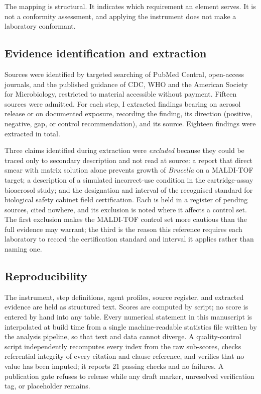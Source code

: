 The mapping is structural. It indicates which requirement an element serves. It is not a
conformity assessment, and applying the instrument does not make a laboratory conformant.

\subsection{Evidence identification and extraction}

Sources were identified by targeted searching of PubMed Central, open-access journals, and
the published guidance of CDC, WHO and the American Society for Microbiology, restricted
to material accessible without payment. Fifteen sources were admitted. For each step, I
extracted findings bearing on aerosol release or on documented exposure, recording the
finding, its direction (positive, negative, gap, or control recommendation), and its
source. Eighteen findings were extracted in total.

Three claims identified during extraction were \emph{excluded} because they could be
traced only to secondary description and not read at source: a report that direct smear
with matrix solution alone prevents growth of \emph{Brucella} on a MALDI-TOF target; a
description of a simulated incorrect-use condition in the cartridge-assay bioaerosol
study; and the designation and interval of the recognised standard for biological safety
cabinet field certification. Each is held in a register of pending sources, cited nowhere,
and its exclusion is noted where it affects a control set. The first exclusion makes the
MALDI-TOF control set more cautious than the full evidence may warrant; the third is the
reason this reference requires each laboratory to record the certification standard and
interval it applies rather than naming one.

\subsection{Reproducibility}

The instrument, step definitions, agent profiles, source register, and extracted evidence
are held as structured text. Scores are computed by script; no score is entered by hand
into any table. Every numerical statement in this manuscript is interpolated at build time
from a single machine-readable statistics file written by the analysis pipeline, so that
text and data cannot diverge. A quality-control script independently recomputes every
index from the raw sub-scores, checks referential integrity of every citation and clause
reference, and verifies that no value has been imputed; it reports 21 passing checks and
no failures. A publication gate refuses to release while any draft marker, unresolved
verification tag, or placeholder remains.
